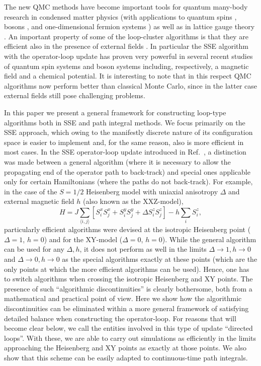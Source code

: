 \documentclass[10pt,pre,aps,twocolumn,showpacs,superscriptaddress,
floatfix]{revtex4}
\begin{document}
The new QMC methods have become important tools for quantum many-body 
research in condensed matter physics (with applications to quantum spins
\cite{harada,troyer,ssexy,ssespin1,ssespin2,wessel1,kato,sachdev,perc,wessel2,yunoki},
bosons \cite{hebert,dorneich1,schmid}, and one-dimensional fermion 
systems \cite{torsten,pinaki}) as well as in lattice gauge theory
\cite{chandrasekharan,cox}. An important property of some of the
loop-cluster algorithms is that they are efficient also in the presence of 
external fields \cite{kashurnikov,sse3,cox,syljuasen}. In particular the SSE 
algorithm with the operator-loop update \cite{sse3} has proven very 
powerful in several recent studies of quantum spin systems 
\cite{wessel2,yunoki} 
and boson systems \cite{hebert,dorneich1,schmid} including, respectively, a 
magnetic field and a chemical potential. It is interesting to note that in 
this respect QMC algorithms now perform better than classical Monte Carlo, 
since in the latter case external fields still pose challenging problems.

In this paper we present a general framework for constructing loop-type 
algorithms both in SSE and path integral methods. We focus primarily on the
SSE approach, which owing to the manifestly discrete nature of its
configuration space is easier to implement and, for the same reason, also 
is more efficient in most cases. In the SSE operator-loop update introduced 
in Ref.~, a distinction was made between a general algorithm
(where it is necessary to allow the propagating end of the operator path to 
back-track) and special ones applicable only for certain Hamiltonians 
(where the paths do not back-track). For example, in the case of
the $S=1/2$ Heisenberg model with uniaxial anisotropy $\Delta$ and external 
magnetic field $h$ (also known as the XXZ-model), 
\begin{equation}
H = J\sum\limits_{\langle i,j\rangle}[ S_i^xS_j^x + S_i^yS_j^y
+ \Delta S_i^zS_j^z] -  h\sum\limits_{i} S^z_i,
\label{ham1}
\end{equation}
particularly efficient algorithms were devised at the isotropic Heisenberg
point ($\Delta=1$, $h=0$) and for the XY-model ($\Delta=0$, $h=0$). While the 
general algorithm can be used for any $\Delta,h$, it does not perform as
well in the limits $\Delta\to 1,h\to 0$ and $\Delta\to 0,h\to 0$ as the 
special algorithms exactly at these points (which are the only points at
which the more efficient algorithms can be used). Hence, one has to switch
algorithms when crossing the isotropic Heisenberg and XY points. The presence 
of such ``algorithmic discontinuities'' is clearly bothersome, both from a 
mathematical and practical point of view. Here we show how the algorithmic 
discontinuities can be eliminated within a more general framework of 
satisfying detailed balance when constructing the operator-loop. For reasons 
that will become clear below, we call the entities involved in this type of 
update ``directed loops''. With these, we are able to carry out simulations 
as efficiently in the limits approaching the Heisenberg and XY points as 
exactly at those points. We also show that this scheme can be easily 
adapted to continuous-time path integrals.
\end{document}
